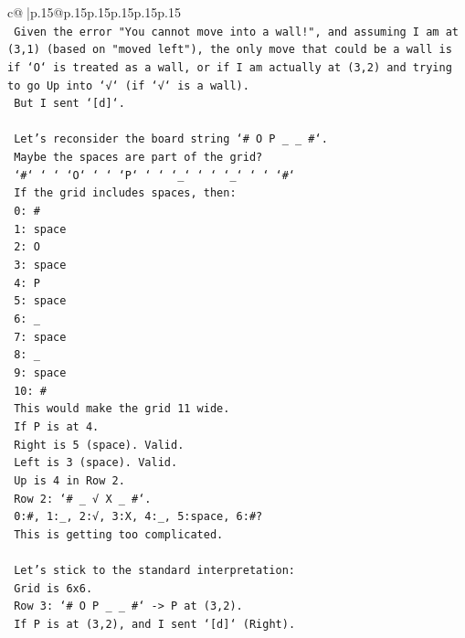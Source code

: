\documentclass{article}
\begin{document}
{\begin{supertabular}{c@{$\;$}|p{.15\linewidth}@{}p{.15\linewidth}p{.15\linewidth}p{.15\linewidth}p{.15\linewidth}p{.15\linewidth}}
{{{\\ 
\texttt{    Given the error "You cannot move into a wall!", and assuming I am at (3,1) (based on "moved left"), the only move that could be a wall is if `O` is treated as a wall, or if I am actually at (3,2) and trying to go Up into `√` (if `√` is a wall).} \\
\texttt{    But I sent `{[}d{]}`.} \\
\\ 
\texttt{    Let's reconsider the board string `\# O P \_ \_ \#`.} \\
\texttt{    Maybe the spaces are part of the grid?} \\
\texttt{    `\#` ` ` `O` ` ` `P` ` ` `\_` ` ` `\_` ` ` `\#`} \\
\texttt{    If the grid includes spaces, then:} \\
\texttt{    0: \#} \\
\texttt{    1: space} \\
\texttt{    2: O} \\
\texttt{    3: space} \\
\texttt{    4: P} \\
\texttt{    5: space} \\
\texttt{    6: \_} \\
\texttt{    7: space} \\
\texttt{    8: \_} \\
\texttt{    9: space} \\
\texttt{    10: \#} \\
\texttt{    This would make the grid 11 wide.} \\
\texttt{    If P is at 4.} \\
\texttt{    Right is 5 (space). Valid.} \\
\texttt{    Left is 3 (space). Valid.} \\
\texttt{    Up is 4 in Row 2.} \\
\texttt{    Row 2: `\# \_ √ X \_ \#`.} \\
\texttt{    0:\#, 1:\_, 2:√, 3:X, 4:\_, 5:space, 6:\#?} \\
\texttt{    This is getting too complicated.} \\
\\ 
\texttt{    Let's stick to the standard interpretation:} \\
\texttt{    Grid is 6x6.} \\
\texttt{    Row 3: `\# O P \_ \_ \#` {-}> P at (3,2).} \\
\texttt{    If P is at (3,2), and I sent `{[}d{]}` (Right).} \\
}}}
\end{supertabular}}
\end{document}
